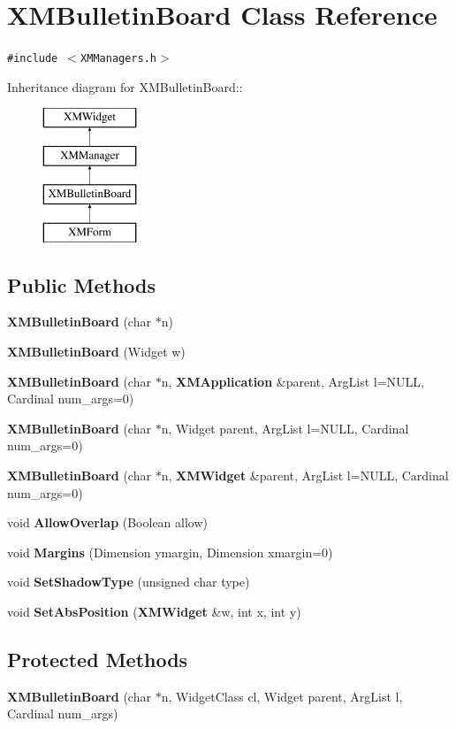 \section{XMBulletin\-Board  Class Reference}
\label{classXMBulletinBoard}
{\tt \#include $<$XMManagers.h$>$}

Inheritance diagram for XMBulletin\-Board::\begin{figure}[H]
\begin{center}
\leavevmode
\includegraphics[height=4cm]{classXMBulletinBoard}
\end{center}
\end{figure}
\subsection*{Public Methods}
\begin{CompactItemize}
\item 
{\bf XMBulletin\-Board} (char $\ast$n)
\item 
{\bf XMBulletin\-Board} (Widget w)
\item 
{\bf XMBulletin\-Board} (char $\ast$n, {\bf XMApplication} \&parent, Arg\-List l=NULL, Cardinal num\_\-args=0)
\item 
{\bf XMBulletin\-Board} (char $\ast$n, Widget parent, Arg\-List l=NULL, Cardinal num\_\-args=0)
\item 
{\bf XMBulletin\-Board} (char $\ast$n, {\bf XMWidget} \&parent, Arg\-List l=NULL, Cardinal num\_\-args=0)
\item 
void {\bf Allow\-Overlap} (Boolean allow)
\item 
void {\bf Margins} (Dimension ymargin, Dimension xmargin=0)
\item 
void {\bf Set\-Shadow\-Type} (unsigned char type)
\item 
void {\bf Set\-Abs\-Position} ({\bf XMWidget} \&w, int x, int y)
\end{CompactItemize}
\subsection*{Protected Methods}
\begin{CompactItemize}
\item 
{\bf XMBulletin\-Board} (char $\ast$n, Widget\-Class cl, Widget parent, Arg\-List l, Cardinal num\_\-args)
\end{CompactItemize}


